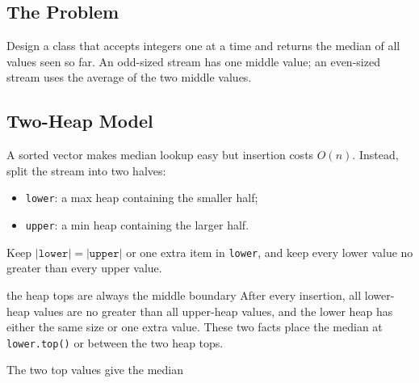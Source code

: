 

\subsection{The Problem}
Design a class that accepts integers one at a time and returns the median of
all values seen so far. An odd-sized stream has one middle value; an even-sized
stream uses the average of the two middle values.

\subsection{Two-Heap Model}
A sorted vector makes median lookup easy but insertion costs \(O(n)\). Instead,
split the stream into two halves:
\begin{itemize}
  \item \texttt{lower}: a max heap containing the smaller half;
  \item \texttt{upper}: a min heap containing the larger half.
\end{itemize}
Keep \(|\texttt{lower}|=|\texttt{upper}|\) or one extra item in
\texttt{lower}, and keep every lower value no greater than every upper value.

\begin{invariantbox}{the heap tops are always the middle boundary}
After every insertion, all lower-heap values are no greater than all
upper-heap values, and the lower heap has either the same size or one extra
value. These two facts place the median at \texttt{lower.top()} or between the
two heap tops.
\end{invariantbox}

\begin{visualbox}{The two top values give the median}
\centering
{}
\end{visualbox}

